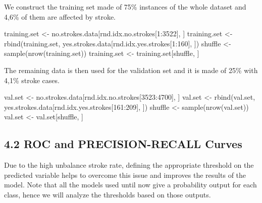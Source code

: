 \documentclass[
]{article}
\newenvironment{Shaded}{\begin{snugshade}}{\end{snugshade}}
\newcommand{\DecValTok}[1]{\textcolor[rgb]{0.00,0.00,0.81}{#1}}
\newcommand{\FunctionTok}[1]{\textcolor[rgb]{0.00,0.00,0.00}{#1}}
\newcommand{\NormalTok}[1]{#1}
\newcommand{\OtherTok}[1]{\textcolor[rgb]{0.56,0.35,0.01}{#1}}
\newcommand{\SpecialCharTok}[1]{\textcolor[rgb]{0.00,0.00,0.00}{#1}}
\begin{document}
We construct the training set made of 75\% instances of the whole
dataset and 4,6\% of them are affected by stroke.

\begin{Shaded}
\begin{Highlighting}[]
\NormalTok{training.set }\OtherTok{\textless{}{-}}\NormalTok{ no.strokes.data[rnd.idx.no.strokes[}\DecValTok{1}\SpecialCharTok{:}\DecValTok{3522}\NormalTok{], ]}
\NormalTok{training.set }\OtherTok{\textless{}{-}} \FunctionTok{rbind}\NormalTok{(training.set, yes.strokes.data[rnd.idx.yes.strokes[}\DecValTok{1}\SpecialCharTok{:}\DecValTok{160}\NormalTok{], ])}
\NormalTok{shuffle }\OtherTok{\textless{}{-}} \FunctionTok{sample}\NormalTok{(}\FunctionTok{nrow}\NormalTok{(training.set))}
\NormalTok{training.set }\OtherTok{\textless{}{-}}\NormalTok{ training.set[shuffle, ]}
\end{Highlighting}
\end{Shaded}

The remaining data is then used for the validation set and it is made of
25\% with 4,1\% stroke cases.

\begin{Shaded}
\begin{Highlighting}[]
\NormalTok{val.set }\OtherTok{\textless{}{-}}\NormalTok{ no.strokes.data[rnd.idx.no.strokes[}\DecValTok{3523}\SpecialCharTok{:}\DecValTok{4700}\NormalTok{], ]}
\NormalTok{val.set }\OtherTok{\textless{}{-}} \FunctionTok{rbind}\NormalTok{(val.set, yes.strokes.data[rnd.idx.yes.strokes[}\DecValTok{161}\SpecialCharTok{:}\DecValTok{209}\NormalTok{], ])}
\NormalTok{shuffle }\OtherTok{\textless{}{-}} \FunctionTok{sample}\NormalTok{(}\FunctionTok{nrow}\NormalTok{(val.set)) }
\NormalTok{val.set }\OtherTok{\textless{}{-}}\NormalTok{ val.set[shuffle, ]}
\end{Highlighting}
\end{Shaded}

\hypertarget{roc-and-precision-recall-curves}{%
\subsection{4.2 ROC and PRECISION-RECALL
Curves}\label{roc-and-precision-recall-curves}}

Due to the high unbalance stroke rate, defining the appropriate
threshold on the predicted variable helps to overcome this issue and
improves the results of the model. Note that all the models used until
now give a probability output for each class, hence we will analyze the
thresholds based on those outputs.
\end{document}
